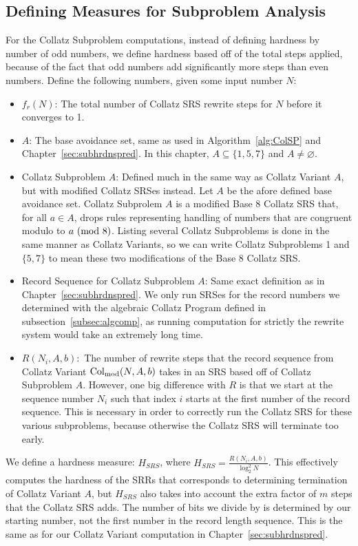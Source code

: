 \subsection{Defining Measures for Subproblem Analysis} \label{subsec:rewritemeasuredefs}
For the Collatz Subproblem computations, instead of defining hardness by number of odd numbers, we define hardness based off of the total steps applied, because of the fact that odd numbers add significantly more steps than even numbers. Define the following numbers, given some input number $N$:
\begin{itemize}
    \item $f_r(N)$: The total number of Collatz SRS rewrite steps for $N$ before it converges to 1.
    \item $A$: The base avoidance set, same as used in Algorithm~\ref{alg:ColSP} and Chapter~\ref{sec:subhrdnspred}. In this chapter, $A \subseteq \{1, 5, 7\}$ and $A \ne \varnothing$. 
    \item Collatz Subproblem $A$: Defined much in the same way as Collatz Variant $A$, but with modified Collatz SRSes instead. Let $A$ be the afore defined base avoidance set.  Collatz Subprolem $A$ is a modified Base 8 Collatz SRS that, for all $a \in A$, drops rules representing handling of numbers that are congruent modulo to $a \ (\mathrm{mod}\ 8)$. Listing several Collatz Subproblems is done in the same manner as Collatz Variants, so we can write Collatz Subproblems 1 and $\{5,7\}$ to mean these two modifications of the Base 8 Collatz SRS.
    \item Record Sequence for Collatz Subproblem $A$: Same exact definition as in Chapter~\ref{sec:subhrdnspred}. We only run SRSes for the record numbers we determined with the algebraic Collatz Program defined in subsection~\ref{subsec:algcomp}, as running computation for strictly the rewrite system would take an extremely long time.
    \item $R(N_i, A, b):$ The number of rewrite steps that the record sequence from Collatz Variant $\mathrm{Col}_{\text{mod}}(N,A,b)$ takes in an SRS based off of Collatz Subproblem $A$. However, one big difference with $R$ is that we start at the sequence number $N_i$ such that index $i$ starts at the first number of the record sequence. This is necessary in order to correctly run the Collatz SRS for these various subproblems, because otherwise the Collatz SRS will terminate too early.
\end{itemize}
We define a hardness measure: $H_{SRS}$, where $H_{SRS} = \frac{R(N_i, A, b)}{\log_2^2{N}}$. This effectively computes the hardness of the SRRs that corresponds to determining termination of Collatz Variant $A$, but $H_{SRS}$ also takes into account the extra factor of $m$ steps that the Collatz SRS adds. The number of bits we divide by is determined by our starting number, not the first number in the record length sequence. This is the same as for our Collatz Variant computation in Chapter~\ref{sec:subhrdnspred}.

